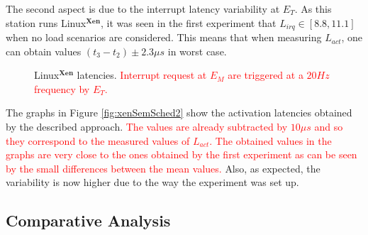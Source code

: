 \documentclass{acm_proc_article-sp}
\newcommand{\col}[1]{\textcolor{red}{#1}}
\begin{document}
The second aspect is due to the interrupt latency variability at $E_T$. As this
station runs Linux$^\mathbf{Xen}$, it was seen in the first experiment that $L_{irq}
\in [8.8,11.1]$ when no load scenarios are considered. This means that when
measuring $L_{act}$, one can obtain values $(t_3 - t_2) \pm 2.3 \mu s$ in worst
case.
%

\begin{figure*}[t!]%
 \centering
  \hspace{10pt}%

  \hspace{10pt}%

 \caption[Activation latencies]{Linux$^{\mathbf{Xen}}$ latencies. \col{Interrupt request at $E_M$
   are triggered at a $20 Hz$ frequency by $E_T$.}}
 \label{fig:latIrqAtiv2}%
\end{figure*}

The graphs in Figure \ref{fig:xenSemSched2} show the activation latencies obtained
by the described approach. \col{The values are already subtracted by $10 \mu s$ and so
they correspond to the measured values of $L_{act}$. The obtained values in
the graphs are very close to the ones obtained by the first experiment as can be
seen by the small differences between the mean values. } Also, as expected, the variability
is now higher due to the way the experiment was set up.

\subsection{Comparative Analysis}
\label{sec:compTable}
\end{document}
